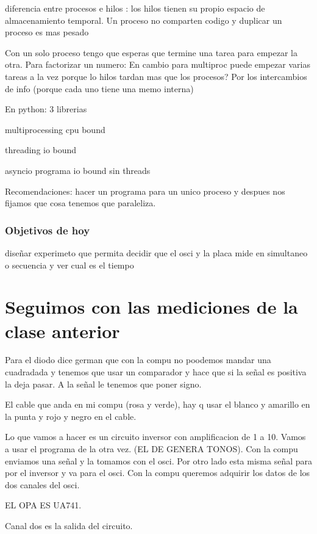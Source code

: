 \documentclass[a4paper,12pt]{article}
\begin{document}
diferencia entre procesos e hilos :  los hilos tienen su propio espacio de almacenamiento temporal. Un proceso no comparten codigo y duplicar un proceso es mas pesado 

Con un solo proceso tengo que esperas que termine una tarea para empezar la otra. 
Para factorizar un numero: En cambio para multiproc puede empezar varias tareas a la vez 
porque lo hilos tardan mas que los procesos? Por los intercambios de info (porque cada uno tiene una memo interna)

En python: 3 librerias

multiprocessing  cpu bound

threading io bound

asyncio programa io bound sin threads

Recomendaciones: hacer un programa para un unico proceso y despues nos fijamos que cosa tenemos que paraleliza. 

\subsubsection{Objetivos de hoy}
diseñar experimeto que permita decidir que el osci y la placa mide en simultaneo o secuencia y ver cual es el tiempo


\section{Seguimos con las mediciones de la clase anterior}
Para el diodo dice german que con la compu no poodemos mandar una cuadradada y tenemos que usar un comparador y hace que si la señal es positiva la deja pasar. A la señal le tenemos que poner signo. 

El cable que anda en mi compu (rosa y verde), hay q usar el blanco y amarillo en la punta y rojo y negro en el cable.  

Lo que vamos a hacer es un circuito inversor con amplificacion de 1 a 10. Vamos a usar el programa de la otra vez. (EL DE GENERA TONOS). Con la compu enviamos una señal y la tomamos con el osci. Por otro lado esta misma señal para por el inversor y va para el osci. 
Con la compu queremos adquirir los datos de los dos canales del osci. 

EL OPA ES UA741.

Canal dos es la salida del circuito. 
\end{document}
